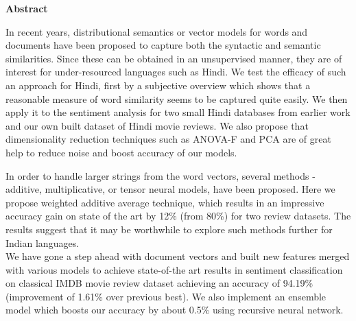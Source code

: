 \cleardoublepage

\begin{center}
	\huge{\textbf{Abstract}}
\end{center}

In recent years, distributional semantics or vector models for words and documents have been proposed to capture both the syntactic and semantic similarities. Since these can be obtained in an unsupervised manner, they are of interest for under-resourced languages such as Hindi.  We test the efficacy of such an approach for Hindi, first by a subjective overview which shows that a reasonable measure of word similarity seems to be captured quite easily.  We then apply it to the sentiment analysis for two small Hindi databases from earlier work and our own built dataset of Hindi movie reviews. We also propose that dimensionality reduction techniques such as ANOVA-F and PCA are of great help to reduce noise and boost accuracy of our models.

In order to handle larger strings from the word vectors, several methods - additive, multiplicative, or tensor neural models, have been proposed.  Here we propose weighted additive average technique, which results in an impressive accuracy gain on state of the art by 12\% (from 80\%) for two review datasets.  The results suggest that it may be worthwhile to explore such methods further for Indian languages.\\
We have gone a step ahead with document vectors and built new features merged with various models to achieve state-of-the art results in sentiment classification on classical IMDB movie review dataset achieving an accuracy of 94.19\%(improvement of 1.61\% over previous best). We also implement an ensemble model which boosts our accuracy by about 0.5\% using recursive neural network.
